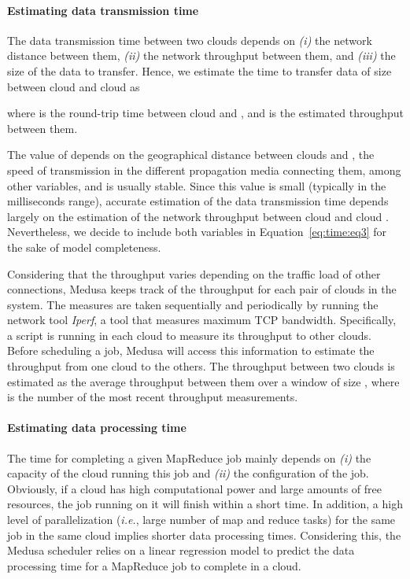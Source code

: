 \documentclass[10pt, conference, compsocconf]{IEEEtran}
\begin{document}
\paragraph{Estimating data transmission time} The data transmission time between two clouds depends on \textit{(i)} the network distance between them, \textit{(ii)} the network throughput between them, and \textit{(iii)} the size of the data to transfer. Hence, we estimate the time to transfer data of size  between cloud  and cloud  as

where  is the round-trip time between cloud  and , and  is the estimated throughput between them.

The value of  depends on the geographical distance between clouds  and , the speed of transmission in the different propagation media connecting them, among other variables, and is usually stable. Since this value is small (typically in the milliseconds range), accurate estimation of the data transmission time depends largely on the estimation of the network throughput  between cloud  and cloud .
Nevertheless, we decide to include both variables in Equation~\ref{eq:time:eq3} for the sake of model completeness.

Considering that the throughput varies depending on the traffic load of other connections, Medusa keeps track of the throughput for each pair of clouds in the system.
The measures are taken sequentially and periodically by running the network tool \emph{Iperf}, a tool that measures maximum TCP bandwidth.
Specifically, a script is running in each cloud to measure its throughput to other clouds.
Before scheduling a job, Medusa will access this information to estimate the throughput from one cloud to the others. The throughput between two clouds is estimated as the average throughput between them over a window of size , where  is the number of the most recent throughput measurements.


\paragraph{Estimating data processing time} The time for completing a given MapReduce job mainly depends on \textit{(i)} the capacity of the cloud running this job and \textit{(ii)} the configuration of the job. Obviously, if a cloud has high computational power and large amounts of free resources, the job running on it will finish within a short time. In addition, a high level of parallelization (\textit{i.e.}, large number of map and reduce tasks) for the same job in the same cloud implies shorter data processing times. Considering this, the Medusa scheduler relies on a linear regression model to predict the data processing time for a MapReduce job to complete in a cloud.
\end{document}
